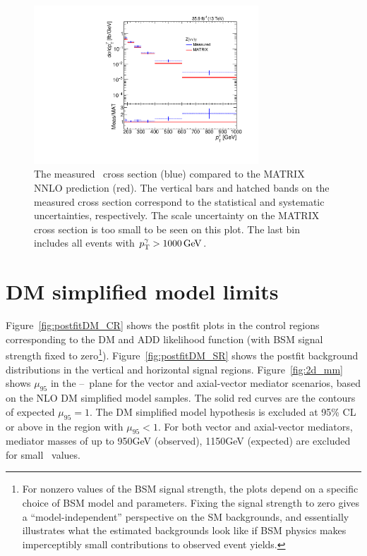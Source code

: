 \begin{figure}[htbp]
  \begin{center}
    \includegraphics[width=0.75\textwidth]{figures/ZNuNuG_measured_vs_MATRIX.pdf}
    \caption{
      The measured \zinvg\ cross section (blue) compared to the MATRIX NNLO prediction (red). The vertical bars and hatched bands
      on the measured cross section correspond to the statistical and systematic uncertainties, respectively. The scale uncertainty
      on the MATRIX cross section is too small to be seen on this plot. The last bin includes all events with $\pTgamma > 1000\unit{GeV}$.
    }
    \label{fig:measvsmat}
  \end{center}
\end{figure}

\section{DM simplified model limits} \label{sec:results_DM}
Figure~\ref{fig:postfitDM_CR} shows the postfit plots in the control regions corresponding to the DM and ADD likelihood function (with
BSM signal strength fixed to zero\footnote{For nonzero values of the BSM signal strength, the plots depend on a specific choice of BSM model
and parameters. Fixing the signal strength to zero gives a ``model-independent'' perspective on the SM backgrounds,
and essentially illustrates what the estimated backgrounds look like if BSM physics makes imperceptibly
small contributions to observed event yields.}).
Figure~\ref{fig:postfitDM_SR} shows the postfit background distributions in the vertical and horizontal signal regions.
Figure~\ref{fig:2d_mm} shows $\mu_{95}$ in the \mmed--\mdm\ plane for the  vector and
axial-vector mediator scenarios, based on the NLO DM simplified model samples. The solid red curves are the
contours of expected $\mu_{95} = 1$. The DM simplified model hypothesis is excluded at 95\% CL or above in the region with $\mu_{95} < 1$.
For both vector and axial-vector mediators, mediator masses of up to 950\unit{GeV} (observed), 1150\unit{GeV} (expected) are excluded
for small \mdm\ values.

